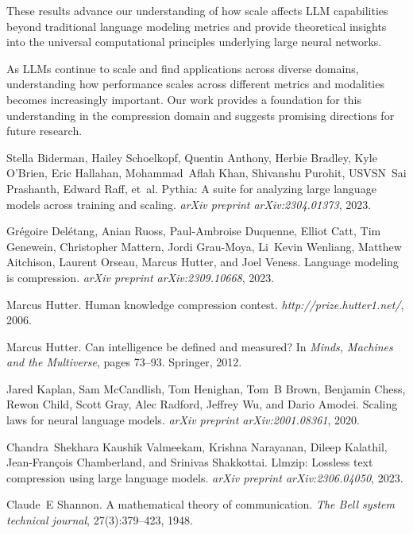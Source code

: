 \documentclass[11pt]{article}
\begin{document}
These results advance our understanding of how scale affects LLM capabilities beyond traditional language modeling metrics and provide theoretical insights into the universal computational principles underlying large neural networks.

As LLMs continue to scale and find applications across diverse domains, understanding how performance scales across different metrics and modalities becomes increasingly important. Our work provides a foundation for this understanding in the compression domain and suggests promising directions for future research.

\newpage


\begin{thebibliography}{10}

Stella Biderman, Hailey Schoelkopf, Quentin Anthony, Herbie Bradley, Kyle O'Brien, Eric Hallahan, Mohammad~Aflah Khan, Shivanshu Purohit, USVSN~Sai Prashanth, Edward Raff, et~al.
\newblock Pythia: A suite for analyzing large language models across training and scaling.
\newblock \emph{arXiv preprint arXiv:2304.01373}, 2023.

Grégoire Delétang, Anian Ruoss, Paul-Ambroise Duquenne, Elliot Catt, Tim Genewein, Christopher Mattern, Jordi Grau-Moya, Li~Kevin Wenliang, Matthew Aitchison, Laurent Orseau, Marcus Hutter, and Joel Veness.
\newblock Language modeling is compression.
\newblock \emph{arXiv preprint arXiv:2309.10668}, 2023.

Marcus Hutter.
\newblock Human knowledge compression contest.
\newblock \emph{http://prize.hutter1.net/}, 2006.

Marcus Hutter.
\newblock Can intelligence be defined and measured?
\newblock In \emph{Minds, Machines and the Multiverse}, pages 73--93. Springer, 2012.

Jared Kaplan, Sam McCandlish, Tom Henighan, Tom~B Brown, Benjamin Chess, Rewon Child, Scott Gray, Alec Radford, Jeffrey Wu, and Dario Amodei.
\newblock Scaling laws for neural language models.
\newblock \emph{arXiv preprint arXiv:2001.08361}, 2020.

Chandra~Shekhara Kaushik Valmeekam, Krishna Narayanan, Dileep Kalathil, Jean-François Chamberland, and Srinivas Shakkottai.
\newblock Llmzip: Lossless text compression using large language models.
\newblock \emph{arXiv preprint arXiv:2306.04050}, 2023.

Claude~E Shannon.
\newblock A mathematical theory of communication.
\newblock \emph{The Bell system technical journal}, 27(3):379--423, 1948.

\end{thebibliography}
\end{document}
